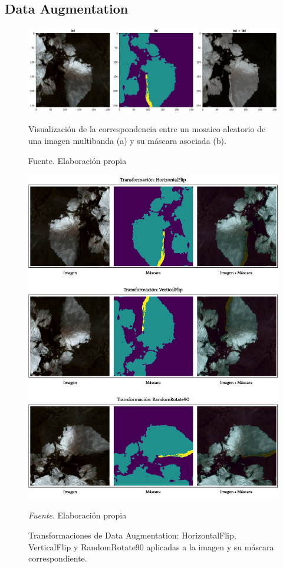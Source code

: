 \documentclass[12pt]{report}
\begin{document}
\subsection{Data Augmentation}


\begin{figure}[H]
   \centering 
   \includegraphics[width=1\textwidth]{Images/VisualizacionMosaicoImagenMascara.png}
   \caption{Visualización de la correspondencia entre un mosaico aleatorio de una imagen multibanda (a) y su máscara asociada (b).}
   \caption*{Fuente. Elaboración propia}
   \label{fig:VisualizacionMosaicoImagenMascara}
\end{figure}


\begin{figure}[H]
\centering 
\includegraphics[width=1\textwidth]{Images/AumentoDeDatos.pdf}
\caption{Transformaciones de Data Augmentation: HorizontalFlip, VerticalFlip y RandomRotate90 aplicadas a la imagen y su máscara correspondiente.}
{\label{fig:AumentoDeDatos} \textit{Fuente}. Elaboración propia}
\end{figure}
\end{document}
